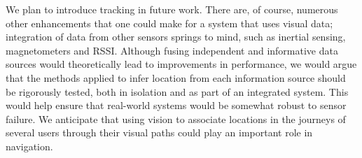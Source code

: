 We plan to introduce tracking in future work. There are, of course, numerous other enhancements that one could make for a system that uses visual data; integration of data from other sensors springs to mind, such as inertial sensing, magnetometers and RSSI.  Although fusing independent and informative data sources would theoretically lead to improvements in performance, we would argue that the methods applied to infer location from each information source should be rigorously tested, both in isolation and as part of an integrated system.  This would help ensure that real-world systems would be somewhat robust to sensor failure. We anticipate that using vision to associate locations in the journeys of several users through their visual paths could play an important role in navigation.

\label{sec:conclusion}


